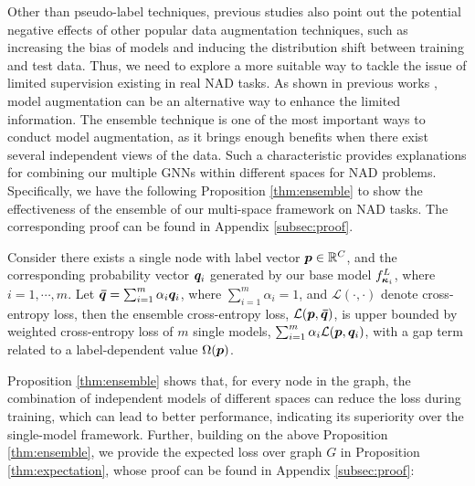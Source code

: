 Other than pseudo-label techniques, previous studies \citep{poordataaug23kirichenko, badaug24lin} also point out the potential negative effects of other popular data augmentation techniques, such as increasing the bias of models and inducing the distribution shift between training and test data. Thus, we need to explore a more suitable way to tackle the issue of limited supervision existing in real NAD tasks. As shown in previous works \citep{modelaug22xia, modelaug24liu}, model augmentation can be an alternative way to enhance the limited information. The ensemble technique is one of the most important ways to conduct model augmentation, as it brings enough benefits when there exist several independent views of the data. Such a characteristic provides explanations for combining our multiple GNNs within different spaces for NAD problems. Specifically, we have the following {\update Proposition} \ref{thm:ensemble} to show the effectiveness of the ensemble of our multi-space framework on NAD tasks. The corresponding proof can be found in Appendix \ref{subsec:proof}. 

\begin{proposition}
    \label{thm:ensemble}
Consider there exists a single node with label vector $\boldsymbol{p}\in \mathbb{R}^C$, and the corresponding probability vector $\boldsymbol{q}_i$ generated by our base model $f_{\boldsymbol{\kappa}_i}^L$, where $i=1,\cdots,m$. Let $\boldsymbol{\bar{q}}=\sum_{i=1}^m\alpha_i\boldsymbol{q}_i$, where $\sum_{i=1}^m\alpha_i=1$, and $\mathcal{L}(\cdot, \cdot)$ denote cross-entropy loss, then the ensemble cross-entropy loss, $\mathcal{L}(\boldsymbol{p}, \boldsymbol{\bar{q}})$, is upper bounded by weighted cross-entropy loss of $m$ single models, $\sum_{i=1}^m\alpha_i\mathcal{L}(\boldsymbol{p}, \boldsymbol{q}_i)$, with a gap term related to a label-dependent value $\Omega(\boldsymbol{p})$. 
\end{proposition}


{\update Proposition} \ref{thm:ensemble} shows that, for every node in the graph, the combination of independent models of different spaces can reduce the loss during training, which can lead to better performance, indicating its superiority over the single-model framework. Further, building on the above {\update Proposition} \ref{thm:ensemble}, we provide the expected loss over graph $G$ in {\update Proposition} \ref{thm:expectation}, whose proof can be found in Appendix \ref{subsec:proof}: 

